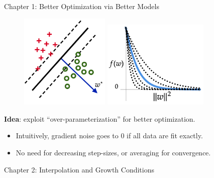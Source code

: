 \documentclass[mathserif,notheorems, hyperref={colorlinks, citecolor=blue, urlcolor=blue, linkcolor=blue}]{beamer}
\begin{document}
    \begin{frame}{Chapter 1: Better Optimization via Better Models}

        \begin{figure}
            \centering
            \includegraphics[width=0.38\textwidth]{figures/separable}
            \hspace{0.2em}
            \includegraphics[width=0.45\textwidth]{figures/loss_fn}
        \end{figure}
        \vspace{0.2em}

        \begin{center}
            \large \textbf{Idea}: exploit ``over-parameterization'' for better optimization.
        \end{center}
        \begin{itemize}
            \item Intuitively, gradient noise goes to $0$ if all data are fit exactly.
            \item No need for decreasing step-sizes, or averaging for convergence. 
        \end{itemize}

    \end{frame}



    \begin{frame}
       \begin{center}
          \huge Chapter 2: Interpolation and Growth Conditions 
       \end{center} 
    \end{frame}
\end{document}
